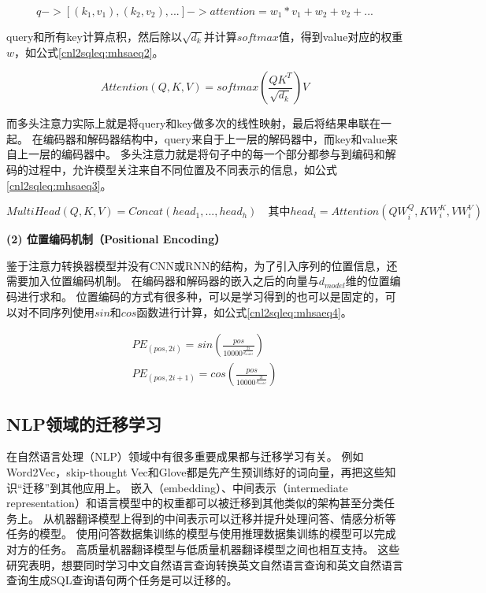 \begin{equation}
  \label{cnl2sqleq:mhsaeq1}
  q -> [(k_1,v_1),(k_2,v_2),...] -> attention = w_1 * v_1 + w_2 +v_2 + ... 
\end{equation}

query和所有key计算点积，然后除以$\sqrt{d_k}$并计算$softmax$值，得到value对应的权重$w$，如公式\ref{cnl2sqleq:mhsaeq2}。

\begin{equation}
  \label{cnl2sqleq:mhsaeq2}
  Attention(Q,K,V) = softmax(\frac{QK^T}{\sqrt{d_k}})V  
\end{equation}

而多头注意力实际上就是将query和key做多次的线性映射，最后将结果串联在一起。
在编码器和解码器结构中，query来自于上一层的解码器中，而key和value来自上一层的编码器中。
多头注意力就是将句子中的每一个部分都参与到编码和解码的过程中，允许模型关注来自不同位置及不同表示的信息，如公式\ref{cnl2sqleq:mhsaeq3}。

\begin{equation}
  \label{cnl2sqleq:mhsaeq3}
  MultiHead(Q,K,V) = Concat(head_1,...,head_h) \quad \mbox{其中} head_i = Attention(QW^Q_i,KW^K_i,VW^V_i)
\end{equation}

\textbf{(2) 位置编码机制（Positional Encoding）}

鉴于注意力转换器模型并没有CNN或RNN的结构，为了引入序列的位置信息，还需要加入位置编码机制。
在编码器和解码器的嵌入之后的向量与$d_{model}$维的位置编码进行求和。
位置编码的方式有很多种，可以是学习得到的也可以是固定的，可以对不同序列使用$sin$和$cos$函数进行计算，如公式\ref{cnl2sqleq:mhsaeq4}。

\begin{gather}
  \label{cnl2sqleq:mhsaeq4}
  PE_{(pos,2i)} = sin(\frac{pos}{10000^{\frac{2i}{d_{model}}}})\\
  PE_{(pos,2i+1)} = cos(\frac{pos}{10000^{\frac{2i}{d_{model}}}}) 
\end{gather}

\subsection{NLP领域的迁移学习}

在自然语言处理（NLP）领域中有很多重要成果都与迁移学习有关。
例如Word2Vec\cite{mikolov2013efficient}，skip-thought Vec\cite{kiros2015skip}和Glove\cite{pennington2014glove}都是先产生预训练好的词向量，再把这些知识“迁移”到其他应用上。
嵌入（embedding）\cite{collobert2008unified,collobert2011natural}、中间表示（intermediate representation）\cite{peters2018deep}和语言模型中的权重\cite{ramachandran2017unsupervised}都可以被迁移到其他类似的架构甚至分类任务\cite{howard2018fine}上。
从机器翻译模型上得到的中间表示可以迁移并提升处理问答、情感分析等任务的模型\cite{mccann2017learned}。
使用问答数据集训练的模型与使用推理数据集训练的模型可以完成对方的任务\cite{min2017question}。
高质量机器翻译模型与低质量机器翻译模型之间也相互支持\cite{zoph2016transfer}。
这些研究表明，想要同时学习中文自然语言查询转换英文自然语言查询和英文自然语言查询生成SQL查询语句两个任务是可以迁移的。

